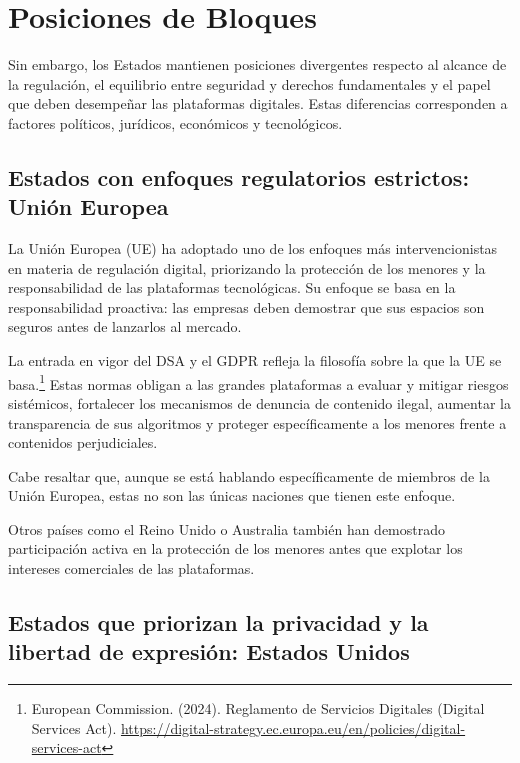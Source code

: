 \section{Posiciones de Bloques}


Sin embargo, los Estados mantienen posiciones divergentes respecto al alcance de la regulación, el equilibrio entre seguridad y derechos fundamentales y el papel que deben desempeñar las plataformas digitales. Estas diferencias corresponden a factores políticos, jurídicos, económicos y tecnológicos.

\subsection{Estados con enfoques regulatorios estrictos: Unión Europea}

La Unión Europea (UE) ha adoptado uno de los enfoques más intervencionistas en materia de regulación digital, priorizando la protección de los menores y la responsabilidad de las plataformas tecnológicas. Su enfoque se basa en la responsabilidad proactiva: las empresas deben demostrar que sus espacios son seguros antes de lanzarlos al mercado.

La entrada en vigor del DSA y el GDPR refleja la filosofía sobre la que la UE se basa.\footnote{European Commission. (2024). Reglamento de Servicios Digitales (Digital Services Act). \url{https://digital-strategy.ec.europa.eu/en/policies/digital-services-act}} Estas normas obligan a las grandes plataformas a evaluar y mitigar riesgos sistémicos, fortalecer los mecanismos de denuncia de contenido ilegal, aumentar la transparencia de sus algoritmos y proteger específicamente a los menores frente a contenidos perjudiciales.

Cabe resaltar que, aunque se está hablando específicamente de miembros de la Unión Europea, estas no son las únicas naciones que tienen este enfoque.

Otros países como el Reino Unido o Australia también han demostrado participación activa en la protección de los menores antes que explotar los intereses comerciales de las plataformas.

\subsection{Estados que priorizan la privacidad y la libertad de expresión: Estados Unidos}

